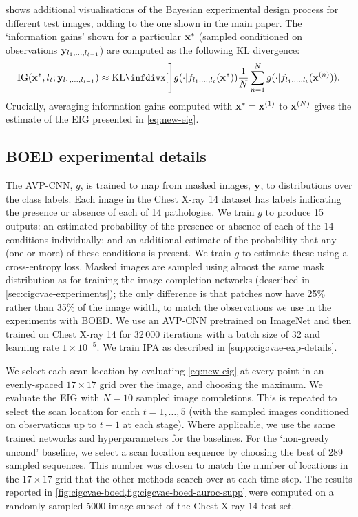  shows additional visualisations of the Bayesian
experimental design process for different test images, adding to the one shown
in the main paper. The `information gains' shown for a particular ${\mathbf{x}}^*$
(sampled conditioned on observations ${\mathbf{y}}_{l{}_1,\ldots,l{}_{t-1}}$) are
computed as the following KL divergence:
\begin{align}
  \label{eq:ig}
                                                   \text{IG}(\rvx^*, \coord{}_t; \rvy_{\coord{}_1,\ldots,\coord{}_{t-1}}) \approx \kl[\Bigg]{g(\cdot|f_{\coord{}_1,\ldots,\coord{}_t}(\rvx^*))}{\frac{1}{N} \sum_{n=1}^N g(\cdot|f_{\coord{}_1,\ldots,\coord{}_t}(\rvx^{(n)}))}.
\end{align}
Crucially, averaging information gains computed with ${\mathbf{x}}^*={\mathbf{x}}^{(1)}$ to
${\mathbf{x}}^{(N)}$ gives the estimate of the EIG presented in \cref{eq:new-eig}.

\subsection{BOED experimental details}
The AVP-CNN, $g$, is trained to map from masked images, ${\mathbf{y}}$, to
distributions over the class labels. Each image in the Chest X-ray 14 dataset
has labels indicating the presence or absence of each of 14 pathologies. We
train $g$ to produce 15 outputs: an estimated probability of the presence or
absence of each of the 14 conditions individually; and an additional estimate of
the probability that any (one or more) of these conditions is present. We train
$g$ to estimate these using a cross-entropy loss. Masked images are sampled
using almost the same mask distribution as for training the image completion
networks (described in \cref{sec:cigcvae-experiments}); the only difference is that
patches now have 25\% rather than 35\% of the image width, to match the
observations we use in the experiments with BOED. We use an AVP-CNN pretrained
on ImageNet and then trained on Chest X-ray 14 for 32\,000 iterations with a
batch size of 32 and learning rate $1\times10^{-5}$. We train IPA as described
in \cref{supp:cigcvae-exp-details}.

We select each scan location by evaluating \cref{eq:new-eig} at every point in
an evenly-spaced $17\times17$ grid over the image, and choosing the maximum. We
evaluate the EIG with $N=10$ sampled image completions. This is repeated to
select the scan location for each $t=1,\ldots,5$ (with the sampled images
conditioned on observations up to $t-1$ at each stage). Where applicable, we use
the same trained networks and hyperparameters for the baselines. For the
`non-greedy uncond' baseline, we select a scan location sequence by choosing the
best of 289 sampled sequences. This number was chosen to match the number of
locations in the $17\times17$ grid that the other methods search over at each
time step. The results reported in \cref{fig:cigcvae-boed,fig:cigcvae-boed-auroc-supp} were
computed on a randomly-sampled 5000 image subset of the Chest X-ray 14 test set.


